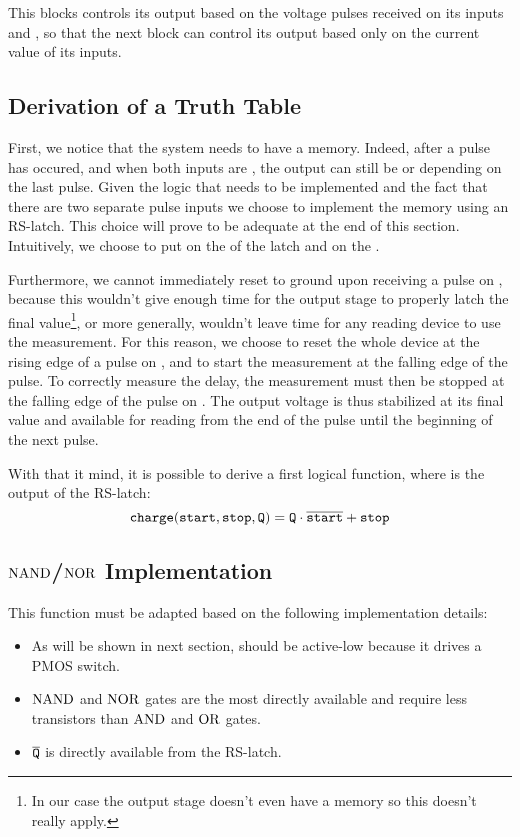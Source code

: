 This blocks controls its output  based on the voltage pulses received on its inputs  and , so that the next block  can control its output  based only on the current value of its inputs.

\subsection{Derivation of a Truth Table}
First, we notice that the system needs to have a memory.
Indeed, after a pulse has occured, and when both inputs are , the output  can still be  or  depending on the last pulse.
Given the logic that needs to be implemented and the fact that there are two separate pulse inputs we choose to implement the memory using an RS-latch.
This choice will prove to be adequate at the end of this section.
Intuitively, we choose to put  on the  of the latch and  on the .

Furthermore, we cannot immediately reset  to ground upon receiving a pulse on , because this wouldn't give enough time for the output stage to properly latch the final value\footnote{In our case the output stage doesn't even have a memory so this doesn't really apply.}, or more generally, wouldn't leave time for any reading device to use the measurement.
For this reason, we choose to reset the whole device at the rising edge of a pulse on , and to start the measurement at the falling edge of the pulse.
To correctly measure the delay, the measurement must then be stopped at the falling edge of the pulse on .
The output voltage is thus stabilized at its final value and available for reading from the end of the  pulse until the beginning of the next  pulse.

With that it mind, it is possible to derive a first logical function, where  is the output of the RS-latch:
\begin{equation}
\mathtt{charge}(\mathtt{start}, \mathtt{stop}, \mathtt{Q}) = \mathtt{Q}\cdot\overline{\mathtt{start}} + \mathtt{stop}\label{eqn:1logic}
\end{equation}

\subsection{$\operatorname{NAND}$/$\operatorname{NOR}$ Implementation}
This function must be adapted based on the following implementation details:
\begin{itemize}
  \item As will be shown in next section,  should be active-low because it drives a PMOS switch.
  \item $\operatorname{NAND}$ and $\operatorname{NOR}$ gates are the most directly available and require less transistors than $\operatorname{AND}$ and $\operatorname{OR}$ gates.
  \item $\overline{\mathtt{Q}}$ is directly available from the RS-latch.
\end{itemize}

